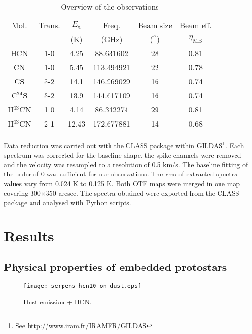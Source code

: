 \documentclass{aa}
\begin{document}
\begin{table}
\caption{Overview of the observations}             %
\label{table:1}      %
\centering                          %
\begin{tabular}{c c c c c c}        %
\hline\hline                 %
Mol. & Trans. & $E_\mathrm{u}$ & Freq. &  Beam size & Beam eff.\\
 & & (K) & (GHz) & ($^{\prime\prime}$) & $\eta_\mathrm{MB}$\\
\hline                        %
HCN & 1-0 & 4.25 & 88.631602 & 28 & 0.81\\
CN & 1-0 & 5.45 & 113.494921 & 22 & 0.78\\
CS & 3-2 & 14.1 & 146.969029 & 16 & 0.74\\
C$^{34}$S & 3-2 & 13.9 & 144.617109 & 16 & 0.74\\
H$^{13}$CN & 1-0 & 4.14 & 86.342274 & 29 & 0.81\\
H$^{13}$CN & 2-1 & 12.43 & 172.677881 & 14 & 0.68\\
\hline                                   
\end{tabular}
\end{table}

Data reduction was carried out with the CLASS package within GILDAS\footnote{See http://www.iram.fr/IRAMFR/GILDAS}. Each spectrum was corrected for the baseline shape, the spike channels were removed and the velocity was resampled to a resolution of 0.5 km/s. The baseline fitting of the order of 0 was sufficient for our observations. The rms of extracted spectra values vary from 0.024 K to 0.125 K. Both OTF maps were merged in one map covering 300$\times$350 arcsec. The spectra obtained were exported from the CLASS package and analysed with Python scripts. 


\section{Results}

\subsection{Physical properties of embedded protostars}

\begin{figure}
   \texttt{[image: serpens\_hcn10\_on\_dust.eps]}
      \caption{Dust emission + HCN.}
         \label{seds}
   \end{figure}
\end{document}
